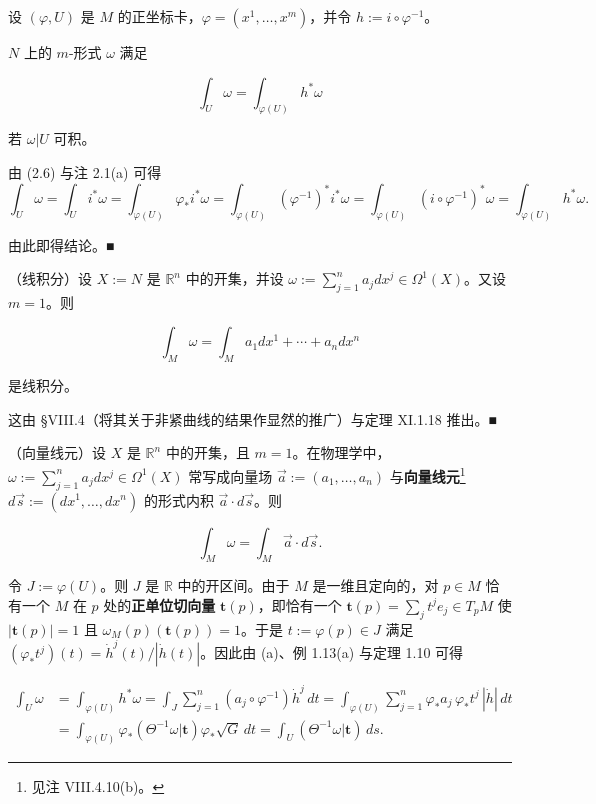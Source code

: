 \begin{remark}

设 $ (\varphi, U) $ 是 $ M $ 的正坐标卡，$ \varphi = (x^1, \ldots, x^m) $，并令 $ h := i \circ \varphi^{-1} $。

\begin{items}
\item

$ N $ 上的 $ m $-形式 $ \omega $ 满足

\[
\int_U \omega = \int_{\varphi(U)} h^* \omega
\]

若 $ \omega|U $ 可积。

\proofhead
由 (2.6) 与注 2.1(a) 可得
\[
\int_U \omega = \int_U i^* \omega = \int_{\varphi(U)} \varphi_* i^* \omega = \int_{\varphi(U)} (\varphi^{-1})^* i^* \omega = \int_{\varphi(U)} (i \circ \varphi^{-1})^* \omega = \int_{\varphi(U)} h^* \omega .
\]

由此即得结论。\nobreak\hspace{0.35em}■

\item

（线积分）设 $ X := N $ 是 $ \mathbb{R}^n $ 中的开集，并设 $ \omega := \sum_{j=1}^n a_j dx^j \in \Omega^1(X) $。又设 $ m = 1 $。则

\[
\int_M \omega = \int_M a_1 dx^1 + \cdots + a_n dx^n
\]

是线积分。

\proofhead
这由 §VIII.4（将其关于非紧曲线的结果作显然的推广）与定理 XI.1.18 推出。\nobreak\hspace{0.35em}■
\item

（向量线元）设 $ X $ 是 $ \mathbb{R}^n $ 中的开集，且 $ m = 1 $。在物理学中，$ \omega := \sum_{j=1}^n a_j dx^j \in \Omega^1(X) $ 常写成向量场 $ \vec a := (a_1, \ldots, a_n) $ 与\textbf{向量线元}\footnote{见注 VIII.4.10(b)。} $ d\vec s := (dx^1, \ldots, dx^n) $ 的形式内积 $ \vec a \cdot d\vec s $。则

\[
\int_M \omega = \int_M \vec a \cdot d\vec s .
\]

令 $ J := \varphi(U) $。则 $ J $ 是 $ \mathbb{R} $ 中的开区间。由于 $ M $ 是一维且定向的，对 $ p \in M $ 恰有一个 $ M $ 在 $ p $ 处的\textbf{正单位切向量} $ \mathbf{t}(p) $，即恰有一个 $ \mathbf{t}(p) = \sum_j t^j e_j \in T_p M $ 使 $ |\mathbf{t}(p)| = 1 $ 且 $ \omega_M(p)(\mathbf{t}(p)) = 1 $。于是 $ t := \varphi(p) \in J $ 满足 $ (\varphi_* t^j)(t) = \dot{h}^j(t)/|\dot{h}(t)| $。因此由 (a)、例 1.13(a) 与定理 1.10 可得

\begin{equation*}
\begin{aligned}
\int_U \omega &= \int_{\varphi(U)} h^* \omega = \int_J \sum_{j=1}^n (a_j \circ \varphi^{-1}) \dot{h}^j \, dt = \int_{\varphi(U)} \sum_{j=1}^n \varphi_* a_j \, \varphi_* t^j \, |\dot{h}| \, dt \\ &= \int_{\varphi(U)} \varphi_*(\Theta^{-1} \omega|\mathbf{t}) \varphi_* \sqrt{G} \, dt = \int_U (\Theta^{-1} \omega|\mathbf{t}) \, ds .
\end{aligned}
\end{equation*}


\end{items}
\end{remark}
